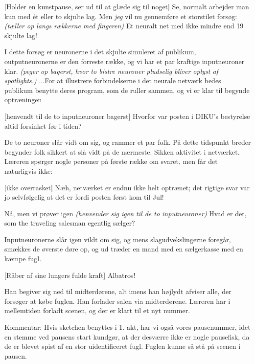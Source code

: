 \documentclass[a4paper,11pt]{article}
\begin{document}
\begin{sketch}
[Holder en kunstpause, ser ud til at glæde sig til noget]
Se, normalt arbejder man kun med \'et eller to skjulte lag. Men {\em jeg}
vil nu gennemføre et storstilet forsøg: {\em (tæller op langs
rækkerne med fingeren)} Et neuralt net med ikke mindre end 19 skjulte lag!

I dette forsøg er neuronerne i det skjulte simuleret af
publikum, outputneuronerne er den forreste række, og vi har et par
kraftige inputneuroner klar. {\em (peger op bagerst, hvor to bistre
neuroner pludselig bliver oplyst af spotlights.)} ...For at illustrere
forbindelserne i det neurale netværk bedes publikum benytte deres
program, som de ruller sammen, og vi er klar til begynde optræningen

[henvendt til de to inputneuroner bagerst]
Hvorfor var
posten i DIKU's bestyrelse altid forsinket før i tiden?

\scene
De to neuroner slår
vidt om sig, og rammer et par folk. På dette tidspunkt breder
begynder folk sikkert at slå vidt på de nærmeste. Sikken aktivitet
i netværket. Læreren spørger nogle personer på første række om
svaret, men får det naturligvis ikke:

[ikke overrasket]
Næh, netværket er endnu ikke helt optrænet; det rigtige
svar var jo selvfølgelig at det er fordi posten først kom til
Jul!

Nå, men vi prøver igen {\em (henvender sig igen til de to
inputneuroner)} Hvad er det, som the traveling salesman egentlig
sælger?

\scene
Inputneuronerne slår igen vildt om sig, og mens
slagudvekslingerne foregår, smækkes de øverste døre op, og ud
træder en mand med en sælgerkasse med en kæmpe fugl.

[Råber af sine lungers fulde kraft]
{\LARGE Albatros!}

\scene 
Han begiver sig ned til midterdørene, alt imens han højlydt
afviser alle, der forsøger at købe fuglen. Han forlader salen via
midterdørene. Læreren har i mellemtiden forladt scenen, og der er
klart til et nyt nummer.


{\footnotesize
Kommentar: Hvis sketchen benyttes i 1. akt, har vi også vores
pausenummer, idet en stemme ved pausens start kundgør, at der
desværre ikke er nogle pausefisk, da de er blevet spist af en stor
uidentificeret fugl. Fuglen kunne så stå på scenen i pausen.}

\end{sketch}
\end{document}

